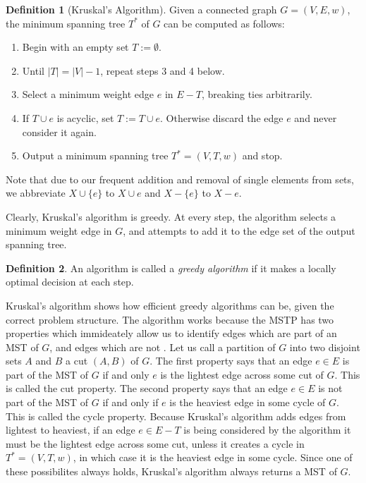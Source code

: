 \documentclass[a4paper,11pt]{report}
\theoremstyle{plain}
\theoremstyle{definition}
\newtheorem{defn}[defn]{Definition}
\begin{document}
\begin{defn}[Kruskal's Algorithm]
Given a connected graph $G = (V,E,w)$, the minimum spanning tree $T^*$ of
$G$ can be computed as follows:
\begin{enumerate}
    \item Begin with an empty set $T := \emptyset$.
    \item Until $|T| = |V| - 1$, repeat steps 3 and 4 below.
    \item Select a minimum weight edge $e$ in $E - T$, breaking ties
    arbitrarily.
    \item If $T \cup e$ is acyclic, set $T := T \cup e$. Otherwise discard
    the edge $e$ and never consider it again.
    \item Output a minimum spanning tree $T^* = (V,T,w)$ and stop.
\end{enumerate}
\end{defn}

Note that due to our frequent addition and removal of single elements from
sets, we abbreviate $X \cup \{e\}$ to $X \cup e$ and $X - \{e\}$ to $X - e$.

Clearly, Kruskal's algorithm is greedy. At every step, the algorithm
selects a minimum weight edge in $G$, and attempts to add it to the edge set
of the output spanning tree.

\begin{defn}
An algorithm is called a \emph{greedy algorithm} if it makes a locally optimal
decision at each step.
\end{defn}

Kruskal's algorithm shows how efficient greedy algorithms can be, given the
correct problem structure. The algorithm works because the MSTP has two
properties which immideately allow us to identify edges which are part of an
MST of $G$, and edges which are not \cite[pp. 10--11]{eisner}. Let us call a
partition of $G$ into two disjoint sets $A$ and $B$ a cut $(A,B)$ of $G$. The
first property says that an edge $e \in E$ is part of the MST of $G$ if and
only $e$ is the lightest edge across some cut of $G$. This is called the cut
property. The second property says that an edge $e \in E$ is not part of the
MST of $G$ if and only if $e$ is the heaviest edge in some cycle of $G$. This
is called the cycle property.  Because Kruskal's algorithm adds edges from
lightest to heaviest, if an edge $e \in E - T$ is being considered by the
algorithm it must be the lightest edge across some cut, unless it creates a
cycle in $T^* = (V,T,w)$, in which case it is the heaviest edge in some cycle.
Since one of these possibilites always holds, Kruskal's algorithm always
returns a MST of $G$.
\end{document}
